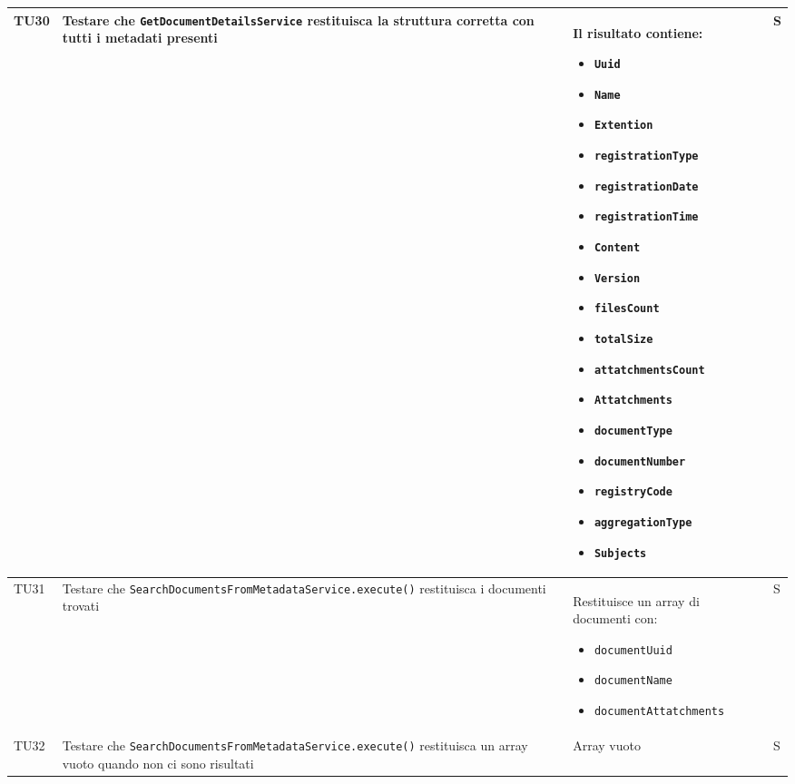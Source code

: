\documentclass[a4paper,12pt]{article}
\begin{document}
\begin{longtable}{|M{1.2cm}|M{5cm}|M{7cm}|M{1.5cm}|}
            TU30 & Testare che \texttt{GetDocumentDetailsService} restituisca la struttura corretta con tutti i metadati presenti & Il risultato contiene:
            \begin{itemize}[leftmargin=*]
                \item \texttt{Uuid}
                \item \texttt{Name}
                \item \texttt{Extention}
                \item \texttt{registrationType}
                \item \texttt{registrationDate}
                \item \texttt{registrationTime}
                \item \texttt{Content}
                \item \texttt{Version}
                \item \texttt{filesCount}
                \item \texttt{totalSize}
                \item \texttt{attatchmentsCount}
                \item \texttt{Attatchments}
                \item \texttt{documentType}
                \item \texttt{documentNumber}
                \item \texttt{registryCode}
                \item \texttt{aggregationType}
                \item \texttt{Subjects}
            \end{itemize} & S \\
            \hline

            TU31 & Testare che \texttt{SearchDocumentsFromMetadataService.execute()} restituisca i documenti trovati & Restituisce un array di documenti con:
            \begin{itemize}[leftmargin=*]
                \item \texttt{documentUuid}
                \item \texttt{documentName}
                \item \texttt{documentAttatchments}
            \end{itemize} & S \\
            \hline

            TU32 & Testare che \texttt{SearchDocumentsFromMetadataService.execute()} restituisca un array vuoto quando non ci sono risultati & Array vuoto & S \\
            \hline


\end{longtable}
\end{document}
